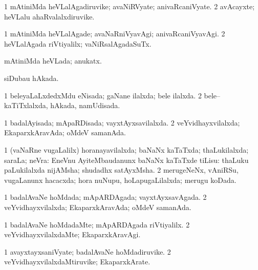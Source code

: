 \bentry
{} 
\gl{\nA}
\expl{}
\bmng
\bnum
\num{1} mAtiniMda heVLalAgadiruvike; avaNiRVyate; anivaRcaniVyate. 
\num{2} avAcayxte; heVLalu ahaRvalalxdiruvike. 
\enum
\emng
\eentry

\bentry
{} 
\gl{\kirxvi}
\expl{}
\bmng
\bnum
\num{1} mAtiniMda heVLalAgade; avaNaRniVyavAgi; anivaRcaniVyavAgi. 
\num{2} heVLalAgada riVtiyalilx; vaNiRsalAgadaSuTx. 
\enum
\emng
\eentry

\bentry
{} 
\gl{\gu}
\expl{}
\bmng
mAtiniMda heVLada; anukatx. 
\emng
\eentry

\bentry
{} 
\gl{\gu}
\expl{}
\bmng
siDubau hAkada. 
\emng
\eentry

\bentry
{} 
\gl{\gu}
\expl{}
\bmng
\bnum
\num{1} beleyaLaLxdedxMdu eNisada; gaNane ilalxda; bele ilalxda. 
\num{2} bele-- kaTiTxlalxda, hAkada, namUdisada. 
\enum
\emng
\eentry

\bentry
{} 
\gl{\gu}
\expl{}
\bmng
\bnum
\num{1} badalAyisada; mApaRDisada; vayxtAyxsavilalxda. 
\num{2} veYvidhayxvilalxda; EkaparxkAravAda; oMdeV samanAda. 
\enum
\emng
\eentry

\bentry
{} 
\gl{\gu}
\expl{}
\bmng
\bnum
\num{1} (vaNaRne \mo vugaLalilx) horanayavilalxda; baNaNx kaTaTxda; thaLukilalxda; saraLa; neVra:  EneVnu AyiteMbaudanunx baNaNx kaTaTxde tiLisu:  thaLuku paLukilalxda nijAMsha; shudadhx satAyxMsha. 
\num{2} merugeNeNx, vAniRSu, \mo vugaLanunx hacacxda; hora nuNupu, hoLapugaLilalxda; merugu koDada. 
\enum
\emng
\eentry

\bentry
{} 
\gl{\gu}
\expl{}
\bmng
\bnum
\num{1} badalAvaNe hoMdada; mApARDAgada; vayxtAyxsavAgada. 
\num{2} veYvidhayxvilalxda; EkaparxkAravAda; oMdeV samanAda. 
\enum
\emng
\eentry

\bentry
{} 
\gl{\kirxvi}
\expl{}
\bmng
\bnum
\num{1} badalAvaNe hoMdadaMte; mApARDAgada riVtiyalilx. 
\num{2} veYvidhayxvilalxdaMte; EkaparxkAravAgi. 
\enum
\emng
\eentry

\bentry
{} 
\gl{\nA}
\expl{}
\bmng
\bnum
\num{1} avayxtayxsaniVyate; badalAvaNe hoMdadiruvike. 
\num{2} veYvidhayxvilalxdaMtiruvike; EkaparxkArate. 
\enum
\emng
\eentry

